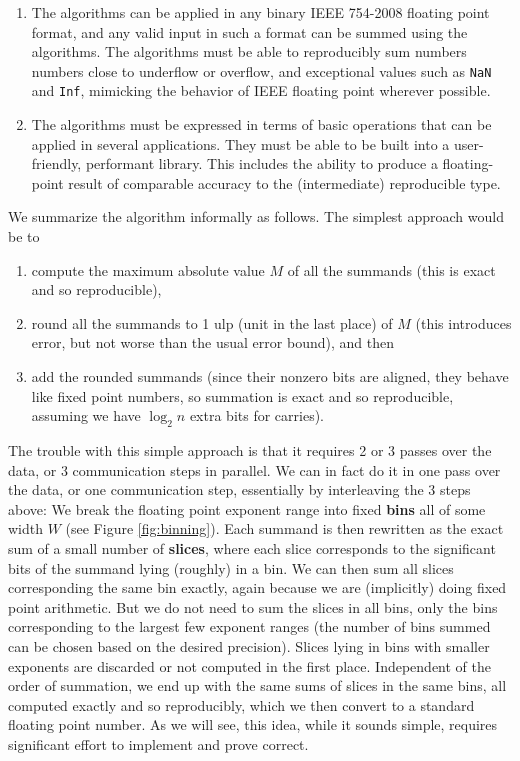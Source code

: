   \begin{enumerate}
    \item The algorithms can be applied in any binary IEEE 754-2008 floating point format, and any valid input in such a format can be summed using the algorithms. The algorithms must be able to reproducibly sum numbers numbers close to underflow or overflow, and exceptional values such as \texttt{NaN} and \texttt{Inf}, mimicking the behavior of IEEE floating point wherever possible.
    \item The algorithms must be expressed in terms of basic operations that can be applied in several applications. They must be able to be built into a user-friendly, performant library. This includes the ability to produce a floating-point result of comparable accuracy to the (intermediate) reproducible type.
  \end{enumerate}

We summarize the algorithm informally as follows.
The simplest approach would be to
\begin{enumerate}
\item compute the maximum absolute value $M$ of all the
summands (this is exact and so reproducible),
\item round all the summands to 1 ulp (unit in the last
place) of $M$ (this introduces error, but not worse than
the usual error bound), and then
\item add the rounded summands (since their nonzero bits
are aligned, they behave like fixed point numbers, so
summation is exact and so reproducible, assuming we
have $\log_2 n$ extra bits for carries).
\end{enumerate}
The trouble with this simple approach is that it requires
2 or 3 passes over the data, or 3 communication steps in parallel.
We can in fact do it in one pass over the data, or one communication
step, essentially by interleaving the 3 steps above:
We break the floating point exponent range into fixed \textbf{bins} all of
some width $W$ (see Figure \ref{fig:binning}). Each summand is then rewritten as the
exact sum of a small number of \textbf{slices}, where each slice corresponds
to the significant bits of the summand lying (roughly) in a bin. We can then sum
all slices corresponding the same bin exactly, again because we are
(implicitly) doing fixed point arithmetic.  But we do not need
to sum the slices in all bins, only the bins corresponding to the largest
few exponent ranges (the number of bins summed can be chosen based on
the desired precision). Slices lying in bins with smaller exponents are
discarded or not computed in the first place. Independent of the order
of summation, we end up with the same sums of slices in the same bins, all computed exactly and
so reproducibly, which we then convert to a standard floating point number.
As we will see, this idea, while it sounds simple, requires significant effort
to implement and prove correct.

